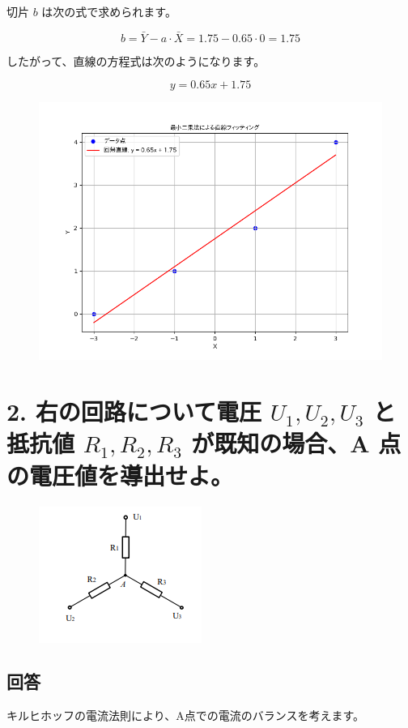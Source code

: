 \documentclass{article}
\begin{document}
切片 \(b\) は次の式で求められます。

\[
b = \bar{Y} - a \cdot \bar{X} = 1.75 - 0.65 \cdot 0 = 1.75
\]

したがって、直線の方程式は次のようになります。

\[
y = 0.65x + 1.75
\]

\begin{figure}[H]
    \centering
    \includegraphics[width=0.7\linewidth]{linear_fit.png}
\end{figure}

\newpage  %

\section*{2. 右の回路について電圧 \(U_1, U_2, U_3\) と抵抗値 \(R_1, R_2, R_3\) が既知の場合、A 点の電圧値を導出せよ。}
\begin{figure}[H]
    \centering
    \includegraphics[width=0.7\linewidth]{2.png}
\end{figure}

\subsection*{回答}
キルヒホッフの電流法則により、A点での電流のバランスを考えます。
\end{document}
